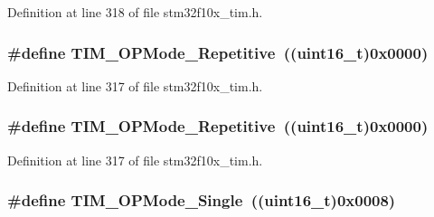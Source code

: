 Definition at line 318 of file stm32f10x\+\_\+tim.\+h.

\subsubsection[{\texorpdfstring{T\+I\+M\+\_\+\+O\+P\+Mode\+\_\+\+Repetitive}{TIM_OPMode_Repetitive}}]{\setlength{\rightskip}{0pt plus 5cm}\#define T\+I\+M\+\_\+\+O\+P\+Mode\+\_\+\+Repetitive~(({\bf uint16\+\_\+t})0x0000)}\hypertarget{group___t_i_m___one___pulse___mode_gad921d739c86bf48dca12442a81ad68ad}{}\label{group___t_i_m___one___pulse___mode_gad921d739c86bf48dca12442a81ad68ad}


Definition at line 317 of file stm32f10x\+\_\+tim.\+h.

\subsubsection[{\texorpdfstring{T\+I\+M\+\_\+\+O\+P\+Mode\+\_\+\+Repetitive}{TIM_OPMode_Repetitive}}]{\setlength{\rightskip}{0pt plus 5cm}\#define T\+I\+M\+\_\+\+O\+P\+Mode\+\_\+\+Repetitive~(({\bf uint16\+\_\+t})0x0000)}\hypertarget{group___t_i_m___one___pulse___mode_gad921d739c86bf48dca12442a81ad68ad}{}\label{group___t_i_m___one___pulse___mode_gad921d739c86bf48dca12442a81ad68ad}


Definition at line 317 of file stm32f10x\+\_\+tim.\+h.

\subsubsection[{\texorpdfstring{T\+I\+M\+\_\+\+O\+P\+Mode\+\_\+\+Single}{TIM_OPMode_Single}}]{\setlength{\rightskip}{0pt plus 5cm}\#define T\+I\+M\+\_\+\+O\+P\+Mode\+\_\+\+Single~(({\bf uint16\+\_\+t})0x0008)}\hypertarget{group___t_i_m___one___pulse___mode_ga99d934fdbc54ea4ee2cf5c86860f9227}{}\label{group___t_i_m___one___pulse___mode_ga99d934fdbc54ea4ee2cf5c86860f9227}


